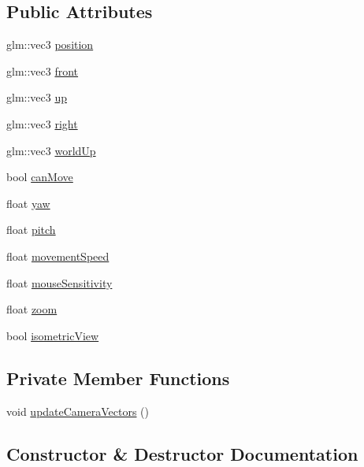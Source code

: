 \subsection*{Public Attributes}
\begin{DoxyCompactItemize}
\item 
glm\+::vec3 \hyperlink{classCamera_a04b5db2c530d8630660e8cfb93a4b3b5}{position}
\item 
glm\+::vec3 \hyperlink{classCamera_a8847cf29c9c124906ad5d97ecb5c55d1}{front}
\item 
glm\+::vec3 \hyperlink{classCamera_a3fe5f351380fb118ffc600591769f049}{up}
\item 
glm\+::vec3 \hyperlink{classCamera_aebffcc6289dd99df7554b18d00a81161}{right}
\item 
glm\+::vec3 \hyperlink{classCamera_a97e7a4ff433ea2bfcbfd40469aaf4d83}{world\+Up}
\item 
bool \hyperlink{classCamera_a2ca23fedd1347287c43a09640fc1b62f}{can\+Move}
\item 
float \hyperlink{classCamera_ad76701b22630f2df28a0ae15f0497a3a}{yaw}
\item 
float \hyperlink{classCamera_ab56fcb39f580e8d2159cf2c9c6d9a65a}{pitch}
\item 
float \hyperlink{classCamera_a03987cf3bbf312be16bb881939382d83}{movement\+Speed}
\item 
float \hyperlink{classCamera_a374b33e654bf21d19230a82672bd3aac}{mouse\+Sensitivity}
\item 
float \hyperlink{classCamera_a21fc9e142b104d8e94126657abaa075f}{zoom}
\item 
bool \hyperlink{classCamera_a64a6a08664697359c21d55a9e1239c0a}{isometric\+View}
\end{DoxyCompactItemize}
\subsection*{Private Member Functions}
\begin{DoxyCompactItemize}
\item 
void \hyperlink{classCamera_ad424b8b92e580508caf21337b69b93fa}{update\+Camera\+Vectors} ()
\end{DoxyCompactItemize}


\subsection{Constructor \& Destructor Documentation}
\mbox{\label{classCamera_abffb81a503c7b170b6799a764d6b99cf}} 
